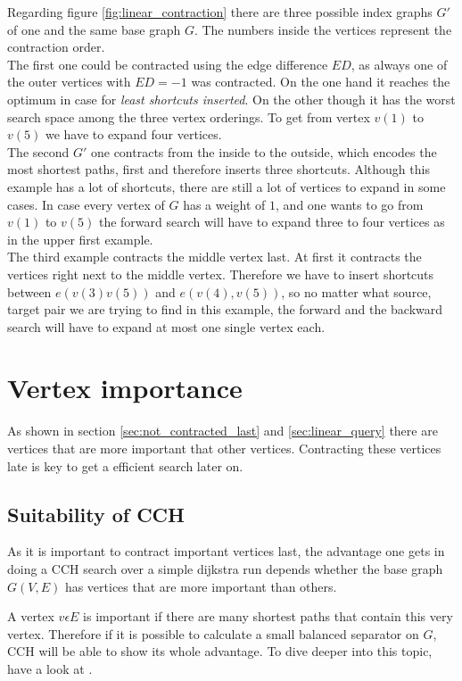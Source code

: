 Regarding figure \ref{fig:linear_contraction} there are three possible index graphs $G'$ of one and the same base graph $G$.
The numbers inside the vertices represent the contraction order.
\\
The first one could be contracted using the edge difference $ED$, as always one of the outer vertices with $ED=-1$ was contracted.
On the one hand it reaches the optimum in case for \textit{least shortcuts inserted}.
On the other though it has the worst search space among the three vertex orderings.
To get from vertex $v(1)$ to $v(5)$ we have to expand four vertices.
\\
The second $G'$ one contracts from the inside to the outside, which encodes the most shortest paths, first and therefore inserts three shortcuts.
Although this example has a lot of shortcuts, there are still a lot of vertices to expand in some cases.
In case every vertex of $G$ has a weight of $1$, and one wants to go from $v(1)$ to $v(5)$ the forward search will have to expand three to four vertices as in the upper first example.
\\
The third example contracts the middle vertex last.
At first it contracts the vertices right next to the middle vertex.
Therefore we have to insert shortcuts between $e(v(3)v(5))$ and $e(v(4), v(5))$, so no matter what source, target pair we are trying to find in this example, the forward and the backward search will have to expand at most one single vertex each.

\section{Vertex importance}\label{sec:vertex_importance}

As shown in section \ref{sec:not_contracted_last} and \ref{sec:linear_query} there are vertices that are more important that other vertices.
Contracting these vertices late is key to get a efficient search later on.


\subsection{Suitability of CCH}

As it is important to contract important vertices last, the advantage one gets in doing a CCH search over a simple dijkstra run depends whether the base graph $G(V, E)$ has vertices that are more important than others.

A vertex $v \epsilon E$ is important if there are many shortest paths that contain this very vertex.
Therefore if it is possible to calculate a small balanced separator on $G$, CCH will be able to show its whole advantage.
To dive deeper into this topic, have a look at \cite[Lower Bounds and Approximation Algorithms for Search Space Sizes in Contraction Hierarchies]{BlumStorandt}.


